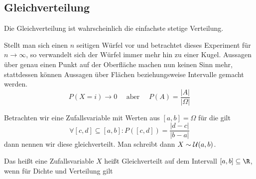 \subsection{Gleichverteilung}
Die Gleichverteilung ist wahrscheinlich die einfachste stetige Verteilung.

Stellt man sich einen $n$ seitigen Würfel vor und betrachtet dieses Experiment für $n\to\infty$, so verwandelt sich der Würfel immer mehr hin zu einer Kugel. Aussagen über genau einen Punkt auf der Oberfläche machen nun keinen Sinn mehr, stattdessen können Aussagen über Flächen beziehungsweise Intervalle gemacht werden.
\begin{equation*}
	P(X=i)\to 0\quad\text{ aber }\quad P(A)=\frac{|A|}{|\Omega|}
\end{equation*}

Betrachten wir eine Zufallsvariable mit Werten aus $[a,b]=\Omega$ für die gilt
\begin{equation*}
	\forall[c,d]\subseteq[a,b]:P([c,d])=\frac{|d-c|}{|b-a|}
\end{equation*}
dann nennen wir diese gleichverteilt. Man schreibt dann $X\sim \mathcal{U}(a,b)$.

Das heißt eine Zufallsvariable $X$ heißt Gleichverteilt auf dem Intervall $[a,b]\subseteq\R$, wenn für Dichte und Verteilung gilt



